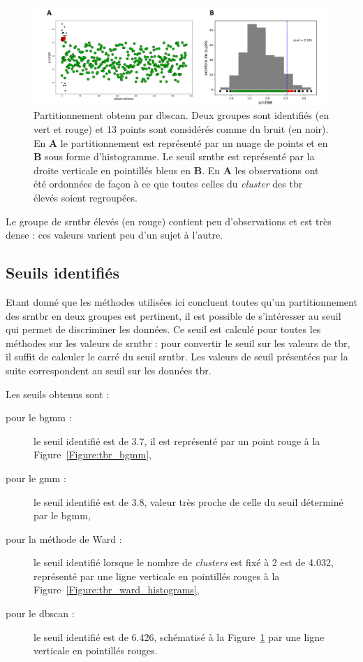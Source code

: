 \begin{figure}[h!]
  \centering
	\includegraphics[width=1.0\linewidth]{figures/chapter-4/tbr-dbscan-clustering-plot} 
  \caption{Partitionnement obtenu par \gls{dbscan}. Deux groupes sont identifiés (en vert et rouge) et 13 points sont considérés comme du bruit (en noir).
	En \textbf{A} le partitionnement est représenté par un nuage de points et en \textbf{B} sous forme d'histogramme. Le seuil \gls{srntbr} est représenté par 
	la droite verticale en pointillés bleus en \textbf{B}. En \textbf{A} les observations ont été ordonnées de façon à ce que toutes celles du \textit{cluster} des \gls{tbr} élevés 
	soient regroupées.}
  \label{Figure:tbr_dbscan_clustering_plot}
\end{figure}

Le groupe de \gls{srntbr} élevés (en rouge) contient peu d'observations et est très dense : ces valeurs varient peu d'un sujet à l'autre.


\subsection{Seuils identifiés}
Etant donné que les méthodes utilisées ici concluent toutes qu'un partitionnement des \gls{srntbr} en deux groupes est pertinent, il est possible de s'intéresser
au seuil qui permet de discriminer les données. Ce seuil est calculé pour toutes les méthodes sur les valeurs de \gls{srntbr} : pour convertir le seuil sur 
les valeurs de \gls {tbr}, il suffit de calculer le carré du seuil \gls{srntbr}. Les valeurs de seuil présentées par la suite correspondent au seuil
sur les données \gls{tbr}.

Les seuils obtenus sont : 
\begin{description}
\item[pour le \gls{bgmm} : ] le seuil identifié est de 3.7, il est représenté par un point rouge à la Figure~\ref{Figure:tbr_bgmm},
\item[pour le \gls{gmm} : ] le seuil identifié est de 3.8, valeur très proche de celle du seuil déterminé par le \gls{bgmm},
\item[pour la méthode de Ward : ] le seuil identifié lorsque le nombre de \textit{clusters} est fixé à 2 est de 4.032, représenté
par une ligne verticale en pointillés rouges à la Figure~\ref{Figure:tbr_ward_histograms},
\item[pour le \gls{dbscan} : ] le seuil identifié est de 6.426, schématisé à la Figure~\ref{Figure:tbr_dbscan_clustering_plot} par une ligne
verticale en pointillés rouges. 
\end{description}

